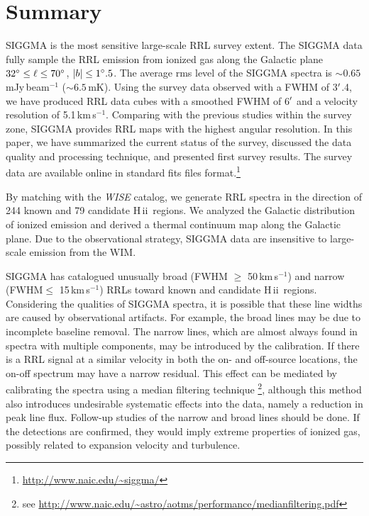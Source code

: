 \documentclass[manuscript]{aastex61}
\newcommand{\hii}{{\rm H\,}{{\sc ii}}}
\newcommand{\kms}{\,km\,s$^{-1}$}
\begin{document}
\section{Summary} \label{sec_summ}
SIGGMA is the most sensitive large-scale RRL survey extent.
The SIGGMA data fully sample the RRL emission from ionized gas along the Galactic plane $32\mbox{$^\circ$} \leq \ell \leq 70\mbox{$^\circ$}$, $|b|\le 1\mbox{$^\circ$}.5$.
The average rms level of the SIGGMA spectra is $\sim0.65$\,mJy\,beam$^{-1}$ ($\sim6.5$\,mK).
Using the survey data observed with a FWHM of 3$\mbox{$^\prime$}$.4, we have produced RRL data cubes with a smoothed FWHM of 6$\mbox{$^\prime$}$ and a velocity resolution of 5.1\kms.
Comparing with the previous studies within the survey zone, SIGGMA provides RRL maps with the highest angular resolution.
In this paper, we have summarized the current status of the survey, discussed the data quality and processing technique, and presented first survey results.
The survey data are available online in standard fits files format.\footnote{\url{http://www.naic.edu/~siggma/}}

By matching with the {\it WISE} catalog, we generate RRL spectra in the direction of 244 known and 79 candidate \hii\ regions.
We analyzed the Galactic distribution of ionized emission and derived a thermal continuum map along the Galactic plane.
Due to the observational strategy, SIGGMA data are insensitive to large-scale emission from the WIM.

SIGGMA has catalogued unusually broad (FWHM $\geq$ 50\kms) and narrow (FWHM$\leq$ 15\kms) RRLs toward known and candidate \hii\ regions. Considering the qualities of SIGGMA spectra, it is possible that these line widths are caused by observational artifacts. For example, the broad lines may be due to incomplete baseline removal. The narrow lines, which are almost always found in spectra with multiple components, may be introduced by the calibration. If there is a RRL signal at a similar velocity in both the on- and off-source locations, the on-off spectrum may have a narrow residual. 
This effect can be mediated by calibrating the spectra using a median filtering technique \citep{McIntyre2013}\footnote{see \url{http://www.naic.edu/~astro/aotms/performance/medianfiltering.pdf}}, although this method also introduces undesirable systematic effects into the data, namely a reduction in peak line flux.
Follow-up studies of the narrow and broad lines should be done. If the detections are confirmed, they would imply extreme properties of ionized gas, possibly related to expansion velocity and turbulence.
\end{document}
